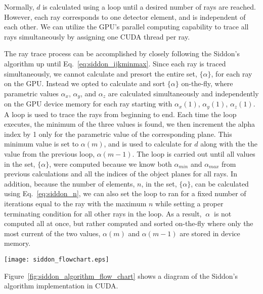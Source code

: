 Normally, $d$ is calculated using a loop until a desired number of rays are reached.  However, each ray corresponds to one detector element, and is independent of each other.  We can utilize the GPU's parallel computing capability to trace all rays simultaneously by assigning one CUDA thread per ray.

The ray trace process can be accomplished by closely following the Siddon's algorithm up until Eq.~\ref{eq:siddon_ijkminmax}.  Since each ray is traced simultaneously, we cannot calculate and presort the entire set, $\{ \alpha \}$, for each ray on the GPU.  Instead we opted to calculate and sort $\{ \alpha \}$ on-the-fly, where parametric values $\alpha_x$, $\alpha_y$, and $\alpha_z$ are calculated simultaneously and independently on the GPU device memory for each ray starting with $\alpha_x(1)$, $\alpha_y(1)$, $\alpha_z(1)$.  A loop is used to trace the rays from beginning to end.  Each time the loop executes, the minimum of the three values is found, we then increment the alpha index by 1 only for the parametric value of the corresponding plane.  This minimum value is set to $\alpha(m)$, and is used to calculate for $d$ along with the the value from the previous loop, $\alpha(m-1)$.  The loop is carried out until all values in the set, $\{ \alpha \}$, were computed because we know both $\alpha_{min}$ and $\alpha_{max}$ from previous calculations and all the indices of the object planes for all rays.  In addition, because the number of elements, $n$, in the set, $\{ \alpha \} $, can be calculated using Eq.~\ref{eq:siddon_n}, we can also set the loop to ran for a fixed number of iterations equal to the ray with the maximum $n$ while setting a proper terminating condition for all other rays in the loop.  As a result, $\ {\alpha\ }$ is not computed all at once, but rather computed and sorted on-the-fly where only the most current of the two values, $\alpha(m)$ and $\alpha(m-1)$ are stored in device memory.  
%
\begin{sidewaysfigure}
\texttt{[image: siddon\_flowchart.eps]}
\caption{The algorithm for Siddon's implementation on CUDA.}
\label{fig:siddon_algorithm_flow_chart}
\end{sidewaysfigure}
%
Figure~\ref{fig:siddon_algorithm_flow_chart} shows a diagram of the Siddon's algorithm implementation in CUDA.

